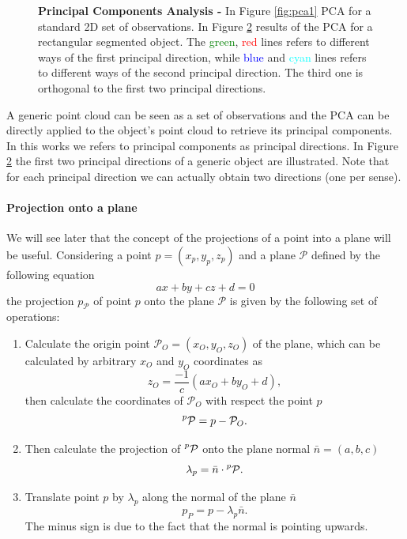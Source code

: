 \begin{figure}[tb]
\begin{subfigure}[t]{0.45\textwidth}
\caption{}\label{fig:pca2}
\end{subfigure}
\caption{\textbf{Principal Components Analysis -} In Figure \ref{fig:pca1} PCA for a standard 2D set of observations. In Figure \ref{fig:pca2} results of the PCA for a rectangular segmented object. The \textcolor{green}{green}, \textcolor{red}{red} lines refers to different ways of the first principal direction, while \textcolor{blue}{blue} and \textcolor{cyan}{cyan} lines refers to different ways of the second principal direction. The third one is orthogonal to the first two principal directions.}
\end{figure}

A generic point cloud can be seen as a set of observations and the PCA can be directly applied to the object's point cloud to retrieve its principal components. In this works we refers to principal components as principal directions. In Figure \ref{fig:pca2} the first two principal directions of a generic object are illustrated. Note that for each principal direction we can actually obtain two directions (one per sense).

\paragraph{Projection onto a plane}
We will see later that the concept of the projections of a point into a plane will be useful. Considering a point $p=(x_p,y_p,z_p)$ and a plane $\mathcal{P}$ defined by the following equation
\begin{equation*}
a x + by + cz + d = 0
\end{equation*}
the projection $p_{\mathcal{P}}$ of point $p$ onto the plane $\mathcal{P}$ is given by the following set of operations:

\begin{enumerate}
\item Calculate the origin point $\mathcal{P}_O=(x_O,y_O,z_O)$ of the plane, which can be calculated by arbitrary $x_O$ and $y_O$ coordinates as
\[
z_O = \frac{-1}{c}(ax_O + by_O + d),
\]
then calculate the coordinates of $\mathcal{P}_O$ with respect the point $p$
\[
\mathcal{\prescript{p}{}P} = p - \mathcal{P}_O.
\]
\item Then calculate the projection of $\mathcal{\prescript{p}{}P}$ onto the plane normal $\bar{n}=(a,b,c)$
\[
\lambda_p = \bar{n} \cdot \mathcal{\prescript{p}{}P}. 
\]
\item Translate point $p$ by $\lambda_p$ along the normal of the plane $\bar{n}$
\[
p_P = p - \lambda_p \bar{n}. 
\]
The minus sign is due to the fact that the normal is pointing upwards.
\end{enumerate}


